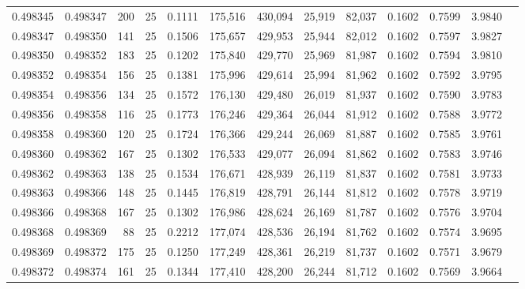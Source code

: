 \begin{tabular}{rrrrrrrrrrrrr}
0.498345 & 0.498347 & 200 &  25 &                                     0.1111 & 175,516 & 430,094 &  25,919 &  82,037 & 0.1602 & 0.7599 & 3.9840 \\
0.498347 & 0.498350 & 141 &  25 &                                     0.1506 & 175,657 & 429,953 &  25,944 &  82,012 & 0.1602 & 0.7597 & 3.9827 \\
0.498350 & 0.498352 & 183 &  25 &                                     0.1202 & 175,840 & 429,770 &  25,969 &  81,987 & 0.1602 & 0.7594 & 3.9810 \\
0.498352 & 0.498354 & 156 &  25 &                                     0.1381 & 175,996 & 429,614 &  25,994 &  81,962 & 0.1602 & 0.7592 & 3.9795 \\
0.498354 & 0.498356 & 134 &  25 &                                     0.1572 & 176,130 & 429,480 &  26,019 &  81,937 & 0.1602 & 0.7590 & 3.9783 \\
0.498356 & 0.498358 & 116 &  25 &                                     0.1773 & 176,246 & 429,364 &  26,044 &  81,912 & 0.1602 & 0.7588 & 3.9772 \\
0.498358 & 0.498360 & 120 &  25 &                                     0.1724 & 176,366 & 429,244 &  26,069 &  81,887 & 0.1602 & 0.7585 & 3.9761 \\
0.498360 & 0.498362 & 167 &  25 &                                     0.1302 & 176,533 & 429,077 &  26,094 &  81,862 & 0.1602 & 0.7583 & 3.9746 \\
0.498362 & 0.498363 & 138 &  25 &                                     0.1534 & 176,671 & 428,939 &  26,119 &  81,837 & 0.1602 & 0.7581 & 3.9733 \\
0.498363 & 0.498366 & 148 &  25 &                                     0.1445 & 176,819 & 428,791 &  26,144 &  81,812 & 0.1602 & 0.7578 & 3.9719 \\
0.498366 & 0.498368 & 167 &  25 &                                     0.1302 & 176,986 & 428,624 &  26,169 &  81,787 & 0.1602 & 0.7576 & 3.9704 \\
0.498368 & 0.498369 &  88 &  25 &                                     0.2212 & 177,074 & 428,536 &  26,194 &  81,762 & 0.1602 & 0.7574 & 3.9695 \\
0.498369 & 0.498372 & 175 &  25 &                                     0.1250 & 177,249 & 428,361 &  26,219 &  81,737 & 0.1602 & 0.7571 & 3.9679 \\
0.498372 & 0.498374 & 161 &  25 &                                     0.1344 & 177,410 & 428,200 &  26,244 &  81,712 & 0.1602 & 0.7569 & 3.9664 \\

\end{tabular}
